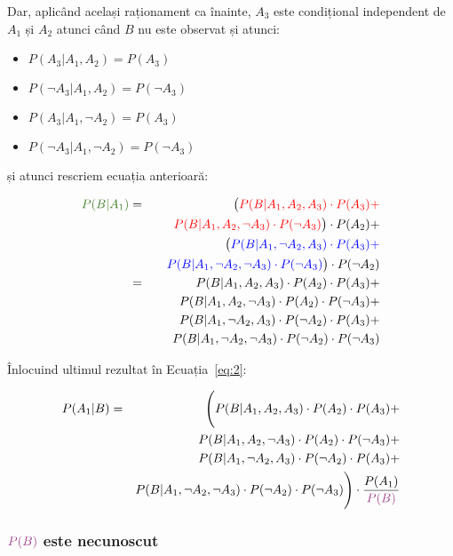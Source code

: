 \documentclass[12pt]{article}
\begin{document}
Dar, aplicând același raționament ca înainte, $A_3$ este condițional
independent de $A_1$ și $A_2$ atunci când $B$ nu este observat și
atunci:
\begin{itemize}
\item $P(A_3 \vert A_1, A_2) = P(A_3)$
\item $P(\neg A_3 \vert A_1, A_2) = P(\neg A_3)$
\item $P(A_3 \vert A_1, \neg A_2) = P(A_3)$
\item $P(\neg A_3 \vert A_1, \neg A_2) = P(\neg A_3)$
\end{itemize}

și atunci rescriem ecuația anterioară:

\begin{eqnarray*}
  \label{eq:5}
  {\color{OliveGreen} P(B \vert A_1)} & = & \big( {\color{red} P(B \vert A_1, A_2, A_3) \cdot P(A_3) + }\\
  & & 
  {\color{red} \quad P(B \vert A_1, A_2, \neg A_3) \cdot P(\neg A_3)} \big) \cdot P(A_2) + \\
  &  & \big( {\color{blue} P(B \vert A_1, \neg A_2, A_3) \cdot P(A_3) + }\\
  & & {\color{blue}\quad P(B \vert A_1, \neg A_2, \neg A_3) \cdot P(\neg A_3)} \big) \cdot P(\neg A_2) \\
  & = & P(B \vert A_1, A_2, A_3) \cdot P(A_2) \cdot P(A_3) + \\
  &  & P(B \vert A_1, A_2, \neg A_3) \cdot P(A_2) \cdot P(\neg A_3) + \\
  &  & P(B \vert A_1, \neg A_2, A_3) \cdot P(\neg A_2) \cdot P(A_3) + \\
  &  & P(B \vert A_1, \neg A_2, \neg A_3) \cdot P(\neg A_2) \cdot P(\neg A_3)
\end{eqnarray*}

Înlocuind ultimul rezultat în Ecuația~\ref{eq:2}:

\begin{eqnarray*}
  P(A_1 | B)   & = & \Bigg(P(B \vert A_1, A_2, A_3) \cdot P(A_2) \cdot P(A_3) + \\
  &  & P(B \vert A_1, A_2, \neg A_3) \cdot P(A_2) \cdot P(\neg A_3) + \\
  &  & P(B \vert A_1, \neg A_2, A_3) \cdot P(\neg A_2) \cdot P(A_3) + \\
  &  & P(B \vert A_1, \neg A_2, \neg A_3) \cdot P(\neg A_2) \cdot P(\neg A_3)\Bigg) \cdot \dfrac{P(A_1)}{{\color{DarkOrchid}P(B)}}
\end{eqnarray*}


\subsubsection*{${\color{DarkOrchid}P(B)}$ este necunoscut}
\label{sec:step3}
\end{document}
